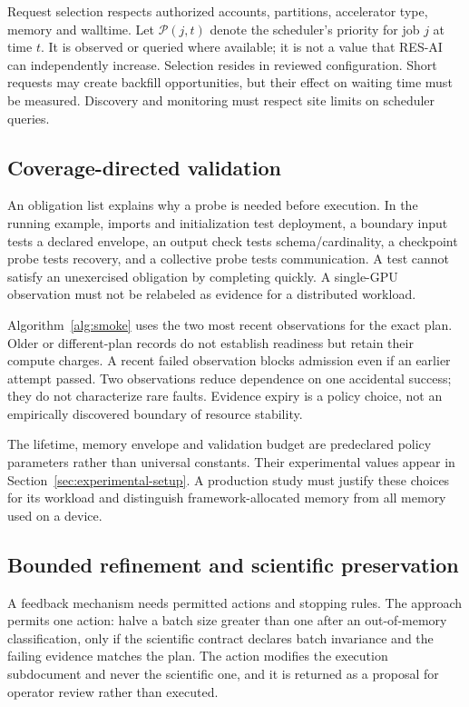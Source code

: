\documentclass[pdflatex,sn-mathphys-num]{sn-jnl}
\theoremstyle{thmstylethree}
\newcommand{\tool}{\textsc{RES-AI}}
\begin{document}
Request selection respects authorized accounts, partitions, accelerator type, memory and walltime. Let $\mathcal{P}(j,t)$ denote the scheduler's priority for job $j$ at time $t$. It is observed or queried where available; it is not a value that \tool{} can independently increase. Selection resides in reviewed configuration. Short requests may create backfill opportunities, but their effect on waiting time must be measured. Discovery and monitoring must respect site limits on scheduler queries.

\subsection{Coverage-directed validation}
An obligation list explains why a probe is needed before execution. In the running example, imports and initialization test deployment, a boundary input tests a declared envelope, an output check tests schema/cardinality, a checkpoint probe tests recovery, and a collective probe tests communication. A test cannot satisfy an unexercised obligation by completing quickly. A single-GPU observation must not be relabeled as evidence for a distributed workload.

Algorithm~\ref{alg:smoke} uses the two most recent observations for the exact plan. Older or different-plan records do not establish readiness but retain their compute charges. A recent failed observation blocks admission even if an earlier attempt passed. Two observations reduce dependence on one accidental success; they do not characterize rare faults. Evidence expiry is a policy choice, not an empirically discovered boundary of resource stability.

The lifetime, memory envelope and validation budget are predeclared policy parameters rather than universal constants. Their experimental values appear in Section~\ref{sec:experimental-setup}. A production study must justify these choices for its workload and distinguish framework-allocated memory from all memory used on a device.

\subsection{Bounded refinement and scientific preservation}
A feedback mechanism needs permitted actions and stopping rules. The approach permits one action: halve a batch size greater than one after an out-of-memory classification, only if the scientific contract declares batch invariance and the failing evidence matches the plan. The action modifies the execution subdocument and never the scientific one, and it is returned as a proposal for operator review rather than executed.
\end{document}
